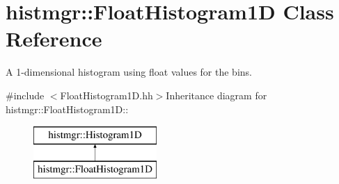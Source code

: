 \section{histmgr::FloatHistogram1D Class Reference}
\label{classhistmgr_1_1FloatHistogram1D}


A 1-\/dimensional histogram using float values for the bins.  


{\ttfamily \#include $<$FloatHistogram1D.hh$>$}Inheritance diagram for histmgr::FloatHistogram1D::\begin{figure}[H]
\begin{center}
\leavevmode
\includegraphics[height=2cm]{classhistmgr_1_1FloatHistogram1D}
\end{center}
\end{figure}
